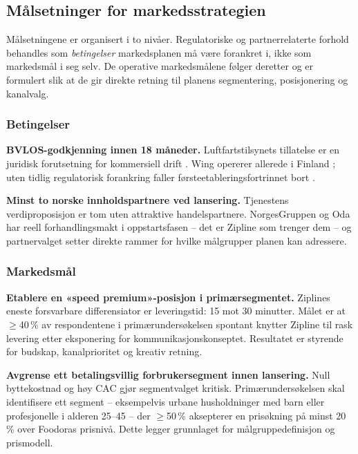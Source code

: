\documentclass[12pt, a4paper]{article}
\begin{document}

\subsection{Målsetninger for markedsstrategien}

Målsetningene er organisert i to nivåer. Regulatoriske og partnerrelaterte
forhold behandles som \textit{betingelser} markedsplanen må være forankret
i, ikke som markedsmål i seg selv. De operative markedsmålene følger
deretter og er formulert slik at de gir direkte retning til planens
segmentering, posisjonering og kanalvalg.

\subsubsection{Betingelser}

\textbf{BVLOS-godkjenning innen 18 måneder.}
Luftfartstilsynets tillatelse er en juridisk forutsetning for kommersiell
drift \parencite{luftfartstilsynet2023}. Wing opererer allerede i Finland
\parencite{wing2024}; uten tidlig regulatorisk forankring faller
førsteetableringsfortrinnet bort \parencite[19]{porter1980}.

\textbf{Minst to norske innholdspartnere ved lansering.}
Tjenestens verdiproposisjon er tom uten attraktive handelspartnere.
NorgesGruppen og Oda har reell forhandlingsmakt i oppstartsfasen
\parencite[23]{porter1980} – det er Zipline som trenger dem – og
partnervalget setter direkte rammer for hvilke målgrupper planen kan
adressere.

\subsubsection{Markedsmål}

\textbf{Etablere en «speed premium»-posisjon i primærsegmentet.}
Ziplines eneste forsvarbare differensiator er leveringstid: 15 mot 30
minutter. Målet er at \(\geq\)40\,\% av respondentene i
primærundersøkelsen spontant knytter Zipline til rask levering etter
eksponering for kommunikasjonskonseptet. Resultatet er styrende for
budskap, kanalprioritet og kreativ retning.

\textbf{Avgrense ett betalingsvillig forbrukersegment innen lansering.}
Null byttekostnad \parencite[24]{porter1980} og høy CAC gjør
segmentvalget kritisk. Primærundersøkelsen skal identifisere ett segment
– eksempelvis urbane husholdninger med barn eller profesjonelle i alderen
25–45 – der \(\geq\)50\,\% aksepterer en prisøkning på minst 20\,\% over
Foodoras prisnivå. Dette legger grunnlaget for målgruppedefinisjon og
prismodell.
\end{document}
